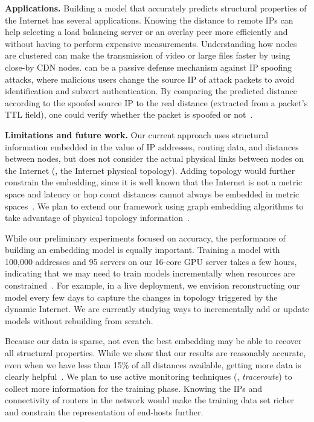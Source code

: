 \textbf{Applications.} Building a model that accurately predicts structural properties of the Internet has several applications. Knowing the distance to remote IPs can help selecting a load balancing server or an overlay peer more efficiently and without having to perform expensive measurements. Understanding how nodes are clustered can make the transmission of video or large files faster by using close-by CDN nodes. 
%
\system{} can be a passive defense mechanism against IP spoofing attacks, where malicious users change the source IP of attack packets to avoid identification and subvert authentication. By comparing the predicted distance according to the spoofed source IP to the real distance (extracted from a packet's TTL field), one could verify whether the packet is spoofed or not~\citep{hc-filter}. 



\textbf{Limitations and future work.}
Our current approach uses structural information embedded in the value of IP addresses, routing data, and distances between nodes, but does not consider the actual physical links between nodes on the Internet (\ie, the Internet physical topology). Adding topology would further constrain the embedding, since it is well known that the Internet is not a metric space and latency or hop count distances cannot always be embedded in metric spaces~\citep{vivaldi}. We plan to extend our framework using graph embedding algorithms to take advantage of physical topology information~\citep{dn-emb}.

While our preliminary experiments focused on accuracy, the performance of building an embedding model is equally important. Training a model with 100,000 addresses and 95 servers on our 16-core GPU server takes a few hours, indicating that we may need to train models incrementally when resources are constrained~\citep{bruzzone1999incremental}. For example, in a live deployment, we envision reconstructing our model every few days to capture the changes in topology triggered by the dynamic Internet. We are currently studying ways to incrementally add or update models without rebuilding from scratch.

Because our data is sparse, not even the best embedding may be able to recover all structural properties. While we show that our results are reasonably accurate, even when we have less than 15\% of all distances available, getting more data is clearly helpful~\citep{barford-infocom}. We plan to use active monitoring techniques (\eg{}, {\em traceroute}) to collect more information for the training phase. Knowing the IPs and connectivity of routers in the network would make the training data set richer and constrain the representation of end-hosts further.


